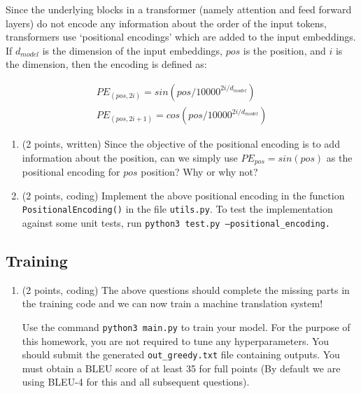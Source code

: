 \documentclass{article}
\theoremstyle{case}
\theoremstyle{definition}
\begin{document}
Since the underlying blocks in a transformer (namely attention and feed forward layers) do not encode any information about the order of the input tokens, transformers use `positional encodings' which are added to the input embeddings. If $d_{model}$ is the dimension of the input embeddings, $pos$ is the position, and $i$ is the dimension, then the encoding is defined as:

\begin{align}
    PE_{(pos, 2i)} = sin(pos/10000^{2i/d_{model}})\\
    PE_{(pos, 2i+1)} = cos(pos/10000^{2i/d_{model}})
\end{align}

\begin{enumerate}
    \item (2 points, written) Since the objective of the positional encoding is to add information about the position, can we simply use $PE_{pos} = sin(pos)$ as the positional encoding for $pos$ position? Why or why not?


    \newpage
    \item (2 points, coding) Implement the above positional encoding in the function \texttt{PositionalEncoding()} in the file \texttt{utils.py}. To test the implementation against some unit tests, run \texttt{python3 test.py --positional\_encoding.}

    
\end{enumerate}


\newpage
\subsection{Training}\label{training_time}

\begin{enumerate}
    
    \item (2 points, coding) The above questions should complete the missing parts in the training code and we can now train a machine translation system!
    
    Use the command \texttt{python3 main.py} to train your model. For the purpose of this homework, you are not required to tune any hyperparameters. You should submit the generated \texttt{out\_greedy.txt} file containing outputs. You must obtain a BLEU score of at least 35 for full points (By default we are using BLEU-4 for this and all subsequent questions).

    
\end{enumerate}
\end{document}
